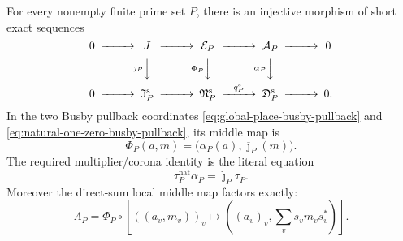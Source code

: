 \begin{theorem}
\label{thm:stable-to-natural-extension-embedding}
For every nonempty finite prime set $P$, there is an injective morphism of
short exact sequences
\begin{equation}
\begin{CD}
0@>>>J@>>>\mathcal E_P@>>>\mathcal A_P@>>>0\\
@.@V{\jmath_P}VV@V{\Phi_P}VV@V{\alpha_P}VV@.\\
0@>>>\mathfrak I_P^{\mathrm s}
 @>>>\mathfrak N_P^{\mathrm s}
 @>{q_P^{\mathrm s}}>>\mathfrak D_P^{\mathrm s}@>>>0.
\end{CD}
\label{eq:stable-to-natural-extension-diagram}
\end{equation}
In the two Busby pullback coordinates
\eqref{eq:global-place-busby-pullback} and
\eqref{eq:natural-one-zero-busby-pullback}, its middle map is
\begin{equation}
 \Phi_P(a,m)=
 \bigl(\alpha_P(a),\overline\jmath_P(m)\bigr).
 \label{eq:stable-to-natural-middle-map}
\end{equation}
The required multiplier/corona identity is the literal equation
\begin{equation}
 \tau_P^{\mathrm{nat}}\alpha_P
 =\dot\jmath_P\tau_P.
 \label{eq:stable-to-natural-global-busby-equation}
\end{equation}
Moreover the direct-sum local middle map factors exactly:
\[
 \Lambda_P
 =\Phi_P\circ
 \left[
 ((a_v,m_v))_v\longmapsto
 \left((a_v)_v,\sum_vs_vm_vs_v^*\right)
 \right].
\]
\end{theorem}


